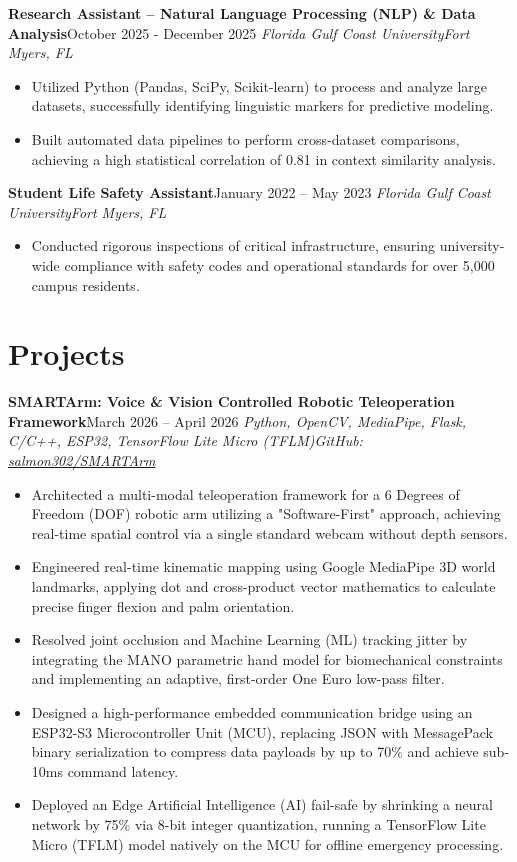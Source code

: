 \documentclass[letterpaper,11pt]{article}
\newcommand{\resumeEntry}[4]{
    \vspace{2pt}
    \noindent\textbf{#1}\hfill{#2}
    \newline
    \noindent\textit{#3}\hfill\textit{#4}
    \vspace{-3pt}
}
\newcommand{\resumeItemListStart}{\begin{itemize}[label=$\bullet$, leftmargin=1.1em, itemsep=0pt, parsep=0pt, topsep=2pt]}
\newcommand{\resumeItemListEnd}{\end{itemize}}
\begin{document}
    \resumeEntry
        {Research Assistant – Natural Language Processing (NLP) \& Data Analysis}
        {October 2025 - December 2025}
        {Florida Gulf Coast University}
        {Fort Myers, FL}
    \resumeItemListStart
        \item Utilized Python (Pandas, SciPy, Scikit-learn) to process and analyze large datasets, successfully identifying linguistic markers for predictive modeling.
        \item Built automated data pipelines to perform cross-dataset comparisons, achieving a high statistical correlation of 0.81 in context similarity analysis.
    \resumeItemListEnd
    
    \resumeEntry
        {Student Life Safety Assistant}
        {January 2022 – May 2023}
        {Florida Gulf Coast University}
        {Fort Myers, FL}
    \resumeItemListStart
        \item Conducted rigorous inspections of critical infrastructure, ensuring university-wide compliance with safety codes and operational standards for over 5,000 campus residents.
    \resumeItemListEnd

\section{Projects}
    \resumeEntry
        {SMARTArm: Voice \& Vision Controlled Robotic Teleoperation Framework}
        {March 2026 – April 2026}
        {Python, OpenCV, MediaPipe, Flask, C/C++, ESP32, TensorFlow Lite Micro (TFLM)}
        {GitHub: \href{https://github.com/salmon302/SMARTArm/tree/Jacks-Branch}{salmon302/SMARTArm}}
    \resumeItemListStart
        \item Architected a multi-modal teleoperation framework for a 6 Degrees of Freedom (DOF) robotic arm utilizing a "Software-First" approach, achieving real-time spatial control via a single standard webcam without depth sensors.
        \item Engineered real-time kinematic mapping using Google MediaPipe 3D world landmarks, applying dot and cross-product vector mathematics to calculate precise finger flexion and palm orientation.
        \item Resolved joint occlusion and Machine Learning (ML) tracking jitter by integrating the MANO parametric hand model for biomechanical constraints and implementing an adaptive, first-order One Euro low-pass filter.
        \item Designed a high-performance embedded communication bridge using an ESP32-S3 Microcontroller Unit (MCU), replacing JSON with MessagePack binary serialization to compress data payloads by up to 70\% and achieve sub-10ms command latency.
        \item Deployed an Edge Artificial Intelligence (AI) fail-safe by shrinking a neural network by 75\% via 8-bit integer quantization, running a TensorFlow Lite Micro (TFLM) model natively on the MCU for offline emergency processing.
    \resumeItemListEnd
\end{document}
